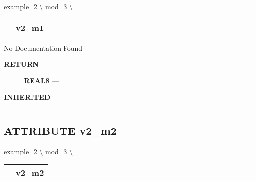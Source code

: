 \hypertarget{ecldoc:intest.in1intest.example_2.mod_1.v2_m1}{}
\hspace{0pt} \hyperlink{ecldoc:intest.in1intest.example_2}{example_2} \textbackslash 
\hspace{0pt} \hyperlink{ecldoc:intest.in1intest.example_2.mod_3}{mod_3} \textbackslash 

{\renewcommand{\arraystretch}{1.5}
\begin{tabularx}{\textwidth}{|>{\raggedright\arraybackslash}l|X|}
\hline
\hspace{0pt}\mytexttt{\color{red} } & \textbf{v2\_m1} \\
\hline
\end{tabularx}
}

\par





No Documentation Found








\par
\begin{description}
\item [\colorbox{tagtype}{\color{white} \textbf{\textsf{RETURN}}}] \textbf{REAL8} --- 
\end{description}






\par
\begin{description}
\item [\colorbox{tagtype}{\color{white} \textbf{\textsf{INHERITED}}}] 
\end{description}



\rule{\linewidth}{0.5pt}
\subsection*{\textsf{\colorbox{headtoc}{\color{white} ATTRIBUTE}
v2\_m2}}

\hypertarget{ecldoc:intest.in1intest.example_2.mod_2.v2_m2}{}
\hspace{0pt} \hyperlink{ecldoc:intest.in1intest.example_2}{example_2} \textbackslash 
\hspace{0pt} \hyperlink{ecldoc:intest.in1intest.example_2.mod_3}{mod_3} \textbackslash 

{\renewcommand{\arraystretch}{1.5}
\begin{tabularx}{\textwidth}{|>{\raggedright\arraybackslash}l|X|}
\hline
\hspace{0pt}\mytexttt{\color{red} } & \textbf{v2\_m2} \\
\hline
\end{tabularx}
}

